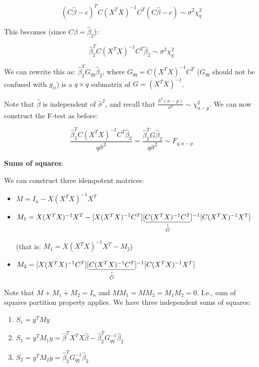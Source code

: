 \documentclass[10pt,landscape]{article}
\newcommand{\explain}[2]{\underset{\mathclap{\overset{\uparrow}{#2}}}{#1}}
\begin{document}
\begin{multicols}{3}
\begin{equation}
(C\hat{\beta} - c)^T C (X^T X)^{-1} C^T (C\hat{\beta} - c) \sim \sigma^2 \chi_q^2
\end{equation}

This becomes (since $C\beta=\hat{\beta}_2$):

\begin{equation}
\hat{\beta}_2^T C (X^T X)^{-1} C^T \hat{\beta}_2 \sim \sigma^2 \chi_q^2
\end{equation}

We can rewrite this as: $\hat{\beta}_2^T G_{qq} \hat{\beta}_2$, where $G_{qq}= C (X^T X)^{-1} C^T$ ($G_{qq}$ should not be confused with $g_{ii}$) is a $q\times q$ submatrix of $G=(X^T X)^{-1}$. 

Note that $\hat{\beta}$ is independent of $\hat{\sigma}^2$, and 
recall that  $\frac{\hat{\sigma}^2 (n-p)}{\sigma^2} \sim \chi_{n-p}^2$. We can now construct the F-test as before:

\begin{equation}
\frac{\hat{\beta}_2^T C (X^T X)^{-1} C^T \hat{\beta}_2}{q\hat{\sigma}^2} = 
\frac{\hat{\beta}_2^T G \hat{\beta}_2}{q\hat{\sigma}^2}
 \sim F_{q,n-p}
\end{equation}


\textbf{Sums of squares}:

We can construct three idempotent matrices:

\begin{itemize}
\item
$M = I_n - X(X^T X)^{-1} X^T$
\item
$M_1 =  X(X^T X)^{-1} X^T -   [X(X^T X)^{-1} C^T]  [\explain{\underline{C (X^T X)^{-1} C^T}}{G}]^{-1}  
[C(X^T X)^{-1} X^T]$

(that is: $M_1 =  X(X^T X)^{-1} X^T - M_2$)

\item $M_2 = [X(X^T X)^{-1} C^T]  [\explain{\underline{C (X^T X)^{-1} C^T}}{G}]^{-1}  
[C(X^T X)^{-1} X^T]$
\end{itemize}

Note that $M+M_1+M_2=I_n$ and $MM_1=MM_2=M_1M_2=0$. I.e., sum of squares partition property applies. We have three independent sums of squares:

\begin{enumerate}
\item $S_r = y^T M y$
\item $S_1 = y^T M_1 y = \hat{\beta}^T X^T X \hat{\beta}-  \hat{\beta}_2^T G_{qq}^{-1} \hat{\beta}_2$
\item $S_2 = y^T M_2 y =  \hat{\beta}_2^T G_{qq}^{-1} \hat{\beta}_2$
\end{enumerate}


\end{multicols}
\end{document}
